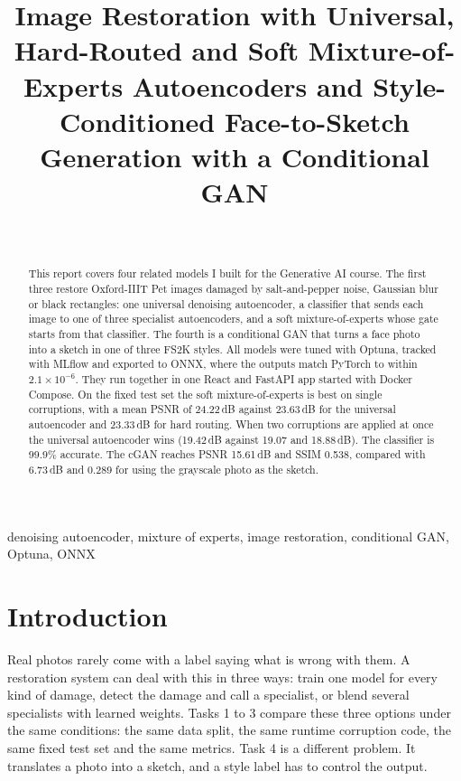 \documentclass[journal,onecolumn,12pt,a4paper]{IEEEtran}
\let\oldsection\section
\renewcommand{\section}[1]{\oldsection{\textbf{#1}}}
\begin{document}
\title{Image Restoration with Universal, Hard-Routed and Soft Mixture-of-Experts Autoencoders and Style-Conditioned Face-to-Sketch Generation with a Conditional GAN}

\author{\\
}

\maketitle

\begin{abstract}
This report covers four related models I built for the Generative AI course. The first three restore Oxford-IIIT Pet images damaged by salt-and-pepper noise, Gaussian blur or black rectangles: one universal denoising autoencoder, a classifier that sends each image to one of three specialist autoencoders, and a soft mixture-of-experts whose gate starts from that classifier. The fourth is a conditional GAN that turns a face photo into a sketch in one of three FS2K styles. All models were tuned with Optuna, tracked with MLflow and exported to ONNX, where the outputs match PyTorch to within $2.1\times10^{-6}$. They run together in one React and FastAPI app started with Docker Compose. On the fixed test set the soft mixture-of-experts is best on single corruptions, with a mean PSNR of 24.22\,dB against 23.63\,dB for the universal autoencoder and 23.33\,dB for hard routing. When two corruptions are applied at once the universal autoencoder wins (19.42\,dB against 19.07 and 18.88\,dB). The classifier is 99.9\% accurate. The cGAN reaches PSNR 15.61\,dB and SSIM 0.538, compared with 6.73\,dB and 0.289 for using the grayscale photo as the sketch.
\end{abstract}

\begin{IEEEkeywords}
denoising autoencoder, mixture of experts, image restoration, conditional GAN, Optuna, ONNX
\end{IEEEkeywords}

\section{Introduction}
Real photos rarely come with a label saying what is wrong with them. A restoration system can deal with this in three ways: train one model for every kind of damage, detect the damage and call a specialist, or blend several specialists with learned weights. Tasks 1 to 3 compare these three options under the same conditions: the same data split, the same runtime corruption code, the same fixed test set and the same metrics. Task 4 is a different problem. It translates a photo into a sketch, and a style label has to control the output.
\end{document}
